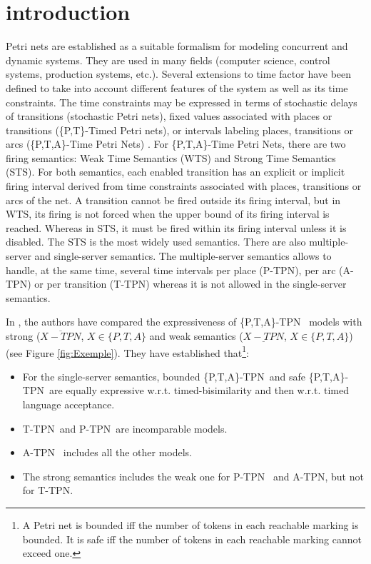 \documentclass[submission,copyright,creativecommons]{eptcs}
\numberwithin{equation}{section}
\def\tapn{A-TPN}
\def\tppn{P-TPN}
\def\ttpn{T-TPN}
\def\ttappn{\{P,T,A\}-TPN}
\begin{document}
\section{introduction}
Petri nets are established as a suitable formalism for modeling
 concurrent and dynamic systems. They are used in many fields (computer science, control systems, production systems, etc.). Several extensions to time factor have
been defined to take into account different features of the system as well as its time constraints. The time constraints may be expressed in terms of stochastic delays of transitions (stochastic Petri nets), fixed values associated with places or transitions (\{P,T\}-Timed Petri nets), or intervals labeling places, transitions or arcs (\{P,T,A\}-Time Petri Nets) \cite{khansa-wodes-96,Merlin,Walter}. For \{P,T,A\}-Time Petri Nets, there are two firing semantics: Weak Time Semantics (WTS) and Strong Time Semantics (STS). For both semantics, each enabled transition has an explicit or implicit firing interval derived from time constraints associated with places, transitions or arcs of the net. A transition cannot be fired outside its firing interval, but in WTS, its firing is not forced when the upper bound of its firing interval is reached. Whereas in STS, it must be fired within its firing interval unless it is disabled. The STS is the most widely used semantics. There are also multiple-server and single-server semantics. The multiple-server semantics allows to handle, at the same time, several time intervals per place (P-TPN), per arc (A-TPN) or per transition (T-TPN) whereas it is not allowed in the single-server semantics. \par In \cite{boyer-FI-08}, the authors have compared the expressiveness of \ttappn~
models with strong ($\overline{X-TPN}$, $X \in \{P,T,A\}$ and weak semantics ({$\underline{X-TPN}$}, $X \in \{P,T,A\}$) (see Figure \ref{fig:Exemple}). They have established that\footnote{A Petri net is bounded iff the number of tokens in each reachable marking is bounded. It is safe iff the number of tokens in each reachable marking cannot exceed one.}:\begin{itemize}
\item For the single-server semantics, bounded \ttappn~and safe \ttappn~are equally expressive w.r.t. timed-bisimilarity and then w.r.t. timed language acceptance.
\item \ttpn~and \tppn~are incomparable models.
\item \tapn~ includes all the other models.
 \item The strong semantics includes the weak one for \tppn~  and
  \tapn, but not for \ttpn.
\end{itemize}
\end{document}
